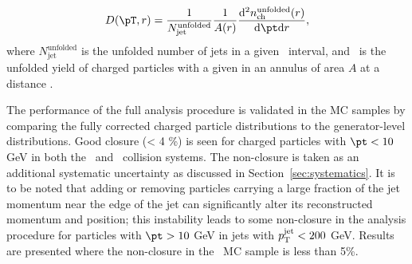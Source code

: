 \begin{align*}
   \Dptr = \frac{1}{N_\mathrm{jet}^\mathrm{unfolded}} \frac{1}{A(r)} \frac{\fd^2 \nchunf(r)}{\fd \pt \fd r},
 \end{align*}
where $N_\mathrm{jet}^\mathrm{unfolded}$ is the unfolded number of jets in a given \ptjet\ interval, and \nchunf\  is the unfolded yield of charged particles with a given \pt in an annulus of area $A$ at a distance \rvar.

The performance of the full analysis procedure is validated in the MC samples by comparing the fully corrected charged particle distributions to the generator-level distributions. Good closure (< 4 \%) is seen for charged particles with $\pt < 10$ GeV in both the \pp\ and \pbpb\ collision systems. The non-closure is taken as an additional systematic uncertainty as discussed in Section~\ref{sec:systematics}.
It is to be noted that adding or removing particles carrying a large fraction of the jet momentum near the edge of the jet can significantly alter its
reconstructed momentum and position; this instability leads to some non-closure in the analysis procedure for particles with $\pt > 10$ GeV in jets with $\mbox{$p_{\mathrm{T}}^{\mathrm{jet}}$} < 200$ GeV. 
Results are presented where the non-closure in the \pp\ MC sample is less than 5\%.




